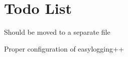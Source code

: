 \chapter{Todo List}
\hypertarget{todo}{}\label{todo}

\begin{DoxyRefList}
\item[page \doxylink{index}{Main Page} ]\label{todo__todo000002}%
%

\begin{DoxyItemize}
\item 
\end{DoxyItemize}


\item[Member \doxylink{namespaceWIP_a11d0d8373a8a6c4eebcc8b0d2dcccac9}{WIP\+::setup\+Easy\+Logging} ()]\label{todo__todo000001}%
%

\begin{DoxyItemize}
\item Should be moved to a separate file
\item Proper configuration of easylogging++ 
\end{DoxyItemize}
\end{DoxyRefList}